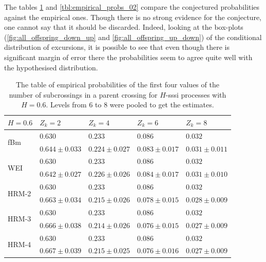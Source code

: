 \documentclass[a4paper]{article}
\begin{document}
The tables \ref{tbl:empirical_probs_01} and \ref{tbl:empirical_probs_02} compare the 
conjectured probabilities against the empirical ones. Though there is no strong evidence
for the conjecture, one cannot say that it should be discarded. Indeed, looking at
the box-plots (\ref{fig:all_offspring_down_up} and \ref{fig:all_offspring_up_down})
of the conditional distribution of excursions, it is possible to see that even
though there is significant margin of error there the probabilities seem to agree
quite well with the hypothesised distribution.
\begin{table}[h]\begin{center}
	\begin{tabular}{l||l|l|l|l|}
					$H=0.6$ & $Z_k = 2$ & $Z_k = 4$ & $Z_k = 6$ & $Z_k = 8$ \\ \hline\hline
	\multirow{2}{*}{fBm} 	& $0.630$ & $0.233$ & $0.086$ & $0.032$ \\ \cline{2-5}
							& $0.644\pm0.033$ & $0.224\pm0.027$ & $0.083\pm0.017$ & $0.031\pm0.011$ \\ \hline\hline
	\multirow{2}{*}{WEI} 	& $0.630$ & $0.233$ & $0.086$ & $0.032$ \\ \cline{2-5}
							& $0.642\pm0.027$ & $0.226\pm0.026$ & $0.084\pm0.017$ & $0.031\pm0.010$ \\ \hline\hline
	\multirow{2}{*}{HRM-2} 	& $0.630$ & $0.233$ & $0.086$ & $0.032$ \\ \cline{2-5}
							& $0.663\pm0.034$ & $0.215\pm0.026$ & $0.078\pm0.015$ & $0.028\pm0.009$ \\ \hline\hline
	\multirow{2}{*}{HRM-3} 	& $0.630$ & $0.233$ & $0.086$ & $0.032$ \\ \cline{2-5}
							& $0.666\pm0.038$ & $0.214\pm0.026$ & $0.076\pm0.015$ & $0.027\pm0.009$ \\ \hline\hline
	\multirow{2}{*}{HRM-4} 	& $0.630$ & $0.233$ & $0.086$ & $0.032$ \\ \cline{2-5}
							& $0.667\pm0.039$ & $0.215\pm0.025$ & $0.076\pm0.016$ & $0.027\pm0.009$ \\ \hline\hline
	\end{tabular}
	\caption{The table of empirical probabilities of the first four values of the number
	of subcrossings in a parent crossing for $H$-sssi processes with $H=0.6$. Levels from
	6 to 8 were pooled to get the estimates.}
\label{tbl:empirical_probs_01}
\end{center}\end{table}
\end{document}
